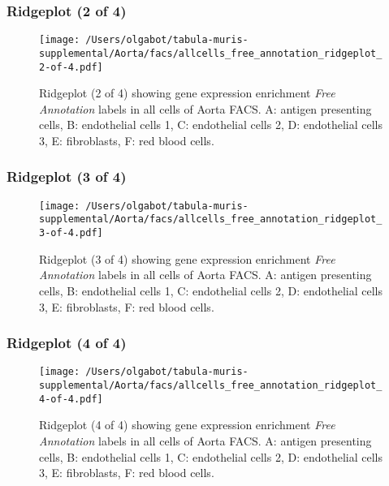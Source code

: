 \clearpage

\subsubsection{Ridgeplot (2 of 4)}
\begin{figure}[h]
\centering
\texttt{[image: /Users/olgabot/tabula-muris-supplemental/Aorta/facs/allcells\_free\_annotation\_ridgeplot\_2-of-4.pdf]}

\caption{ Ridgeplot (2 of 4)  showing gene expression enrichment \emph{Free Annotation} labels in all cells of Aorta FACS. A: antigen presenting cells, B: endothelial cells 1, C: endothelial cells 2, D: endothelial cells 3, E: fibroblasts, F: red blood cells.}
\end{figure}


\clearpage

\subsubsection{Ridgeplot (3 of 4)}
\begin{figure}[h]
\centering
\texttt{[image: /Users/olgabot/tabula-muris-supplemental/Aorta/facs/allcells\_free\_annotation\_ridgeplot\_3-of-4.pdf]}

\caption{ Ridgeplot (3 of 4)  showing gene expression enrichment \emph{Free Annotation} labels in all cells of Aorta FACS. A: antigen presenting cells, B: endothelial cells 1, C: endothelial cells 2, D: endothelial cells 3, E: fibroblasts, F: red blood cells.}
\end{figure}


\clearpage

\subsubsection{Ridgeplot (4 of 4)}
\begin{figure}[h]
\centering
\texttt{[image: /Users/olgabot/tabula-muris-supplemental/Aorta/facs/allcells\_free\_annotation\_ridgeplot\_4-of-4.pdf]}

\caption{ Ridgeplot (4 of 4)  showing gene expression enrichment \emph{Free Annotation} labels in all cells of Aorta FACS. A: antigen presenting cells, B: endothelial cells 1, C: endothelial cells 2, D: endothelial cells 3, E: fibroblasts, F: red blood cells.}
\end{figure}


\clearpage

